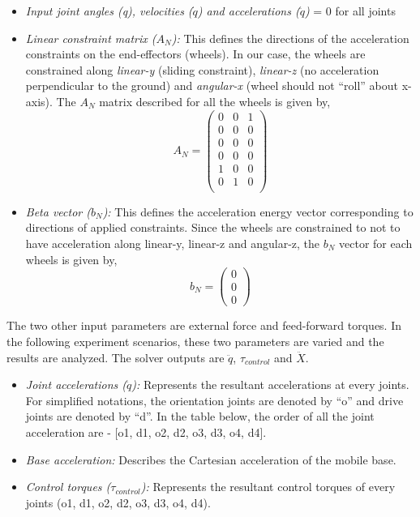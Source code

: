 \begin{itemize}
	\item \textit{Input joint angles (q), velocities ($\dot{q}$) and accelerations ($\ddot{q}$)} = 0 for all joints
	\item \textit{Linear constraint matrix ($A_N$):} This defines the directions of the acceleration constraints on the end-effectors (wheels). In our case, the wheels are constrained along \textit{linear-y} (sliding constraint), \textit{linear-z} (no acceleration perpendicular to the ground) and \textit{angular-x} (wheel should not ``roll'' about x-axis). The $A_N$ matrix described for all the wheels is given by, 
	\begin{equation}
		A_N = \begin{pmatrix}
		 0 & 0 & 1 \\
		 0 & 0 & 0 \\
		 0 & 0 & 0 \\
		 0 & 0 & 0 \\
		 1 & 0 & 0 \\
		 0 & 1 & 0 \\
		\end{pmatrix}
	\end{equation} 
	\item \textit{Beta vector ($b_N$):} This defines the acceleration energy vector corresponding to directions of applied constraints. Since the wheels are constrained to not to have acceleration along linear-y, linear-z and angular-z, the $b_N$ vector for each wheels is given by,
	\begin{equation}
		b_N = \begin{pmatrix}
		0 \\
		0 \\
		0
		\end{pmatrix}
	\end{equation}
\end{itemize}

The two other input parameters are external force and feed-forward torques. In the following experiment scenarios, these two parameters are varied and the results are analyzed.  
The solver outputs are $\ddot{q}$, $\tau_{control}$ and $\ddot{X}$. 
\begin{itemize}
	\item \textit{Joint accelerations ($\ddot{q}$):} Represents the resultant accelerations at every joints. For simplified notations, the orientation joints are denoted by ``o'' and drive joints are denoted by ``d''. In the table below, the order of all the joint acceleration are - [o1, d1, o2, d2, o3, d3, o4, d4].
	\item \textit{Base acceleration:} Describes the Cartesian acceleration of the mobile base.
	\item \textit{Control torques ($\tau_{control}$):} Represents the resultant control torques of every joints (o1, d1, o2, d2, o3, d3, o4, d4). 
\end{itemize} 

